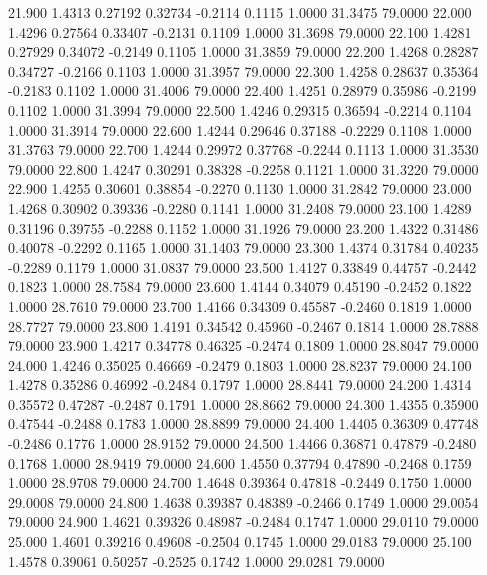   21.900   1.4313   0.27192   0.32734  -0.2114   0.1115   1.0000  31.3475  79.0000
  22.000   1.4296   0.27564   0.33407  -0.2131   0.1109   1.0000  31.3698  79.0000
  22.100   1.4281   0.27929   0.34072  -0.2149   0.1105   1.0000  31.3859  79.0000
  22.200   1.4268   0.28287   0.34727  -0.2166   0.1103   1.0000  31.3957  79.0000
  22.300   1.4258   0.28637   0.35364  -0.2183   0.1102   1.0000  31.4006  79.0000
  22.400   1.4251   0.28979   0.35986  -0.2199   0.1102   1.0000  31.3994  79.0000
  22.500   1.4246   0.29315   0.36594  -0.2214   0.1104   1.0000  31.3914  79.0000
  22.600   1.4244   0.29646   0.37188  -0.2229   0.1108   1.0000  31.3763  79.0000
  22.700   1.4244   0.29972   0.37768  -0.2244   0.1113   1.0000  31.3530  79.0000
  22.800   1.4247   0.30291   0.38328  -0.2258   0.1121   1.0000  31.3220  79.0000
  22.900   1.4255   0.30601   0.38854  -0.2270   0.1130   1.0000  31.2842  79.0000
  23.000   1.4268   0.30902   0.39336  -0.2280   0.1141   1.0000  31.2408  79.0000
  23.100   1.4289   0.31196   0.39755  -0.2288   0.1152   1.0000  31.1926  79.0000
  23.200   1.4322   0.31486   0.40078  -0.2292   0.1165   1.0000  31.1403  79.0000
  23.300   1.4374   0.31784   0.40235  -0.2289   0.1179   1.0000  31.0837  79.0000
  23.500   1.4127   0.33849   0.44757  -0.2442   0.1823   1.0000  28.7584  79.0000
  23.600   1.4144   0.34079   0.45190  -0.2452   0.1822   1.0000  28.7610  79.0000
  23.700   1.4166   0.34309   0.45587  -0.2460   0.1819   1.0000  28.7727  79.0000
  23.800   1.4191   0.34542   0.45960  -0.2467   0.1814   1.0000  28.7888  79.0000
  23.900   1.4217   0.34778   0.46325  -0.2474   0.1809   1.0000  28.8047  79.0000
  24.000   1.4246   0.35025   0.46669  -0.2479   0.1803   1.0000  28.8237  79.0000
  24.100   1.4278   0.35286   0.46992  -0.2484   0.1797   1.0000  28.8441  79.0000
  24.200   1.4314   0.35572   0.47287  -0.2487   0.1791   1.0000  28.8662  79.0000
  24.300   1.4355   0.35900   0.47544  -0.2488   0.1783   1.0000  28.8899  79.0000
  24.400   1.4405   0.36309   0.47748  -0.2486   0.1776   1.0000  28.9152  79.0000
  24.500   1.4466   0.36871   0.47879  -0.2480   0.1768   1.0000  28.9419  79.0000
  24.600   1.4550   0.37794   0.47890  -0.2468   0.1759   1.0000  28.9708  79.0000
  24.700   1.4648   0.39364   0.47818  -0.2449   0.1750   1.0000  29.0008  79.0000
  24.800   1.4638   0.39387   0.48389  -0.2466   0.1749   1.0000  29.0054  79.0000
  24.900   1.4621   0.39326   0.48987  -0.2484   0.1747   1.0000  29.0110  79.0000
  25.000   1.4601   0.39216   0.49608  -0.2504   0.1745   1.0000  29.0183  79.0000
  25.100   1.4578   0.39061   0.50257  -0.2525   0.1742   1.0000  29.0281  79.0000
